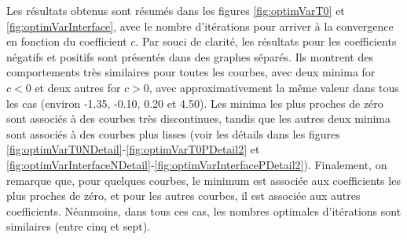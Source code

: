 \indent Les résultats obtenus sont résumés dans les figures \ref{fig:optimVarT0} et \ref{fig:optimVarInterface}, avec le nombre d'itérations pour arriver à la convergence en fonction du coefficient $c$. Par souci de clarité, les résultats pour les coefficients négatifs et positifs sont présentés dans des graphes séparés. Ils montrent des comportements très similaires pour toutes les courbes, avec deux minima for $c < 0$ et deux autres for $c > 0$, avec approximativement la même valeur dans tous les cas (environ -1.35, -0.10, 0.20 et 4.50). Les minima les plus proches de zéro sont associés à des courbes très discontinues, tandis que les autres deux minima sont associés à des courbes plus lisses (voir les détails dans les figures \ref{fig:optimVarT0NDetail}-\ref{fig:optimVarT0PDetail2} et \ref{fig:optimVarInterfaceNDetail}-\ref{fig:optimVarInterfacePDetail2}). Finalement, on remarque que, pour quelques courbes, le minimum est associée aux coefficients les plus proches de zéro, et pour les autres courbes, il est associée aux autres coefficients. Néanmoins, dans tous ces cas, les nombres optimales d'itérations sont similaires (entre cinq et sept).

